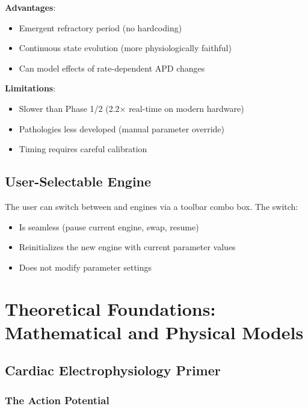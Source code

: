 \documentclass[12pt,a4paper,oneside]{book}
\begin{document}
\noindent \textbf{Advantages}:
\begin{itemize}
    \item Emergent refractory period (no hardcoding)
    \item Continuous state evolution (more physiologically faithful)
    \item Can model effects of rate-dependent APD changes
\end{itemize}

\noindent \textbf{Limitations}:
\begin{itemize}
    \item Slower than Phase 1/2 (2.2$\times$ real-time on modern hardware)
    \item Pathologies less developed (manual parameter override)
    \item Timing requires careful calibration
\end{itemize}

\section{User-Selectable Engine}

The user can switch between \phaseI and \phaseIII engines via a toolbar combo box. The switch:
\begin{itemize}
    \item Is seamless (pause current engine, swap, resume)
    \item Reinitializes the new engine with current parameter values
    \item Does not modify parameter settings
\end{itemize}

\chapter{Theoretical Foundations: Mathematical and Physical Models}

\section{Cardiac Electrophysiology Primer}

\subsection{The Action Potential}
\end{document}
